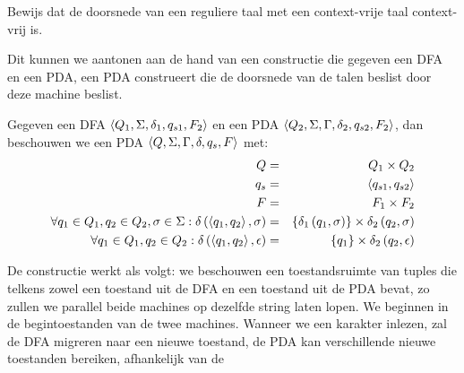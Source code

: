 \documentclass[a4paper]{article}
\begin{document}
\begin{question}
Bewijs dat de doorsnede van een reguliere taal met een context-vrije taal context-vrij is.

\begin{answer}
Dit kunnen we aantonen aan de hand van een constructie die gegeven een DFA en een PDA, een PDA construeert die de doorsnede van de talen beslist door deze machine beslist.
\begin{construction}
Gegeven een DFA $\left\langle Q_1,\Sigma,\delta_1,q_{s1},F_2 \right\rangle$ en een PDA $\left\langle Q_2,\Sigma,\Gamma,\delta_2,q_{s2},F_2 \right\rangle$, dan beschouwen we een PDA $\left\langle Q,\Sigma,\Gamma,\delta,q_s,F \right\rangle$ met:
\begin{eqnarray}
Q&=&Q_1\times Q_2\\
q_s&=&\left\langle q_{s1},q_{s2} \right\rangle\\
F&=&F_1\times F_2\\
\forall q_1\in Q_1,q_2\in Q_2,\sigma\in\Sigma:\delta\left( \left\langle q_1,q_2 \right\rangle,\sigma \right)&=&\left\{ \delta_1\left( q_1,\sigma \right) \right\}\times\delta_2\left( q_2,\sigma \right)\\
\forall q_1\in Q_1,q_2\in Q_2:\delta\left( \left\langle q_1,q_2 \right\rangle,\epsilon \right)&=&\left\{ q_1 \right\}\times\delta_2\left( q_2,\epsilon \right)
\end{eqnarray}
\end{construction}
De constructie werkt als volgt: we beschouwen een toestandsruimte van tuples die telkens zowel een toestand uit de DFA en een toestand uit de PDA bevat, zo zullen we parallel beide machines op dezelfde string laten lopen. We beginnen in de begintoestanden van de twee machines. Wanneer we een karakter inlezen, zal de DFA migreren naar een nieuwe toestand, de PDA kan verschillende nieuwe toestanden bereiken, afhankelijk van de 
\end{answer}

\end{question}
\end{document}
